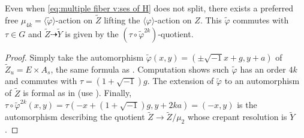 \documentclass[reqno, letterpaper]{amsart}
\numberwithin{equation}{subsection}
\let\to\longrightarrow
\begin{document}
		\begin{lemma} \label{lem:multiple fiber v:lift of varphi}
			Even when \eqref{eq:multiple fiber v:ses of H} does not split, there exists a preferred free $\mu_{4k} = \langle \tilde \varphi \rangle$-action on $\tilde Z$ lifting the $\langle \varphi \rangle$-action on $Z$. This $\tilde \varphi$ commutes with $\tau \in G$ and $\tilde Z \dashrightarrow \tilde Y$ is given by the $(\tau \circ \tilde \varphi^{2k})$-quotient.
		\end{lemma}
		\begin{proof}
			Simply take the automorphism $\tilde \varphi (x,y) = (\pm \sqrt{-1} x + g, y + a)$ of $\tilde Z_u = E \times A_s$, the same formula as . Computation shows such $\tilde \varphi$ has an order $4k$ and commutes with $\tau = (1+\sqrt{-1})g$. The extension of $\tilde \varphi$ to an automorphism of $\tilde Z$ is formal as in  (use ). Finally, $\tau \circ \tilde \varphi^{2k}(x,y) = \tau(-x + (1 + \sqrt{-1})g, y + 2ka) = (-x,y)$ is the automorphism describing the quotient $\tilde Z \to \tilde Z / \mu_2$ whose crepant resolution is $\tilde Y$.
		\end{proof}
		
\end{document}

